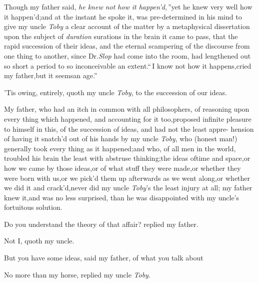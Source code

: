 \documentclass{article}
\begin{document}
Though my father said, \lqq\textit{he knew not}\break
\lqq\textit{how it happen’d},\,”\tsk yet he knew very well how it happen’d;\tsh and
at the instant he spoke it, was pre-determined in his mind to
give my uncle \textit{Toby} a clear account of the matter by a
metaphysical dissertation upon the subject of
\textit{duration}
surations in the brain it came to pass,
that the rapid succession of their ideas, and the eternal
scampering of the discourse from one thing to another, since
Dr.\@ \textit{Slop} had come into the room, had lengthened out
so short a period to so inconceivable an extent.\tsk “\,I know not
how it happens,\break\tsk cried my father,\tsk\lqq but it
seems\break\lqq an age.”

\tsk ’Tis owing, entirely, quoth my uncle
\textit{Toby}, to the succession of our ideas.

My father, who had an itch in common with all philosophers, of
reasoning upon every thing which happened, and accounting for it
too,\tsk proposed infinite pleasure to himself in this, of the
succession of ideas, and had not the least appre- hension of having
it snatch’d out of his hands by my uncle \textit{Toby}, who (honest man!)
generally took every thing as it happened;\tsh and who, of
all men in the world, troubled his brain the least with abstruse
thinking;\tsk the ideas of\break time and space,\tsk or how we came by
those ideas,\tsk or of what stuff they were made,\tsk or
whether they were born with us,\tsk or we pick’d them up
afterwards as we went along,\tsk or whether we did it
and crack’d,\tsh never did my uncle \textit{Toby}’s the least injury
at all; my father knew it,\tsk and was no less surprised, than
he was disappointed with my uncle’s fortuitous solution.

Do you understand the theory of that affair? replied my
father.

Not I, quoth my uncle.

\tsh But you have some ideas, said my father, of what you talk
about\tsh

No more than my horse, replied my uncle \textit{Toby}.
\end{document}
